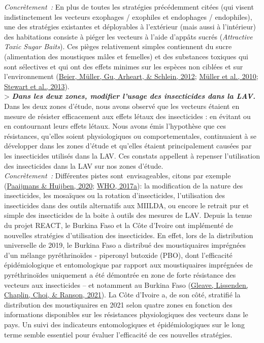 \documentclass[12pt,twoside]{reedthesis}
\begin{document}
\emph{Concrètement~:} En plus de toutes les stratégies précédemment citées (qui visent indistinctement les vecteurs exophages / exophiles et endophages / endophiles), une des stratégies existantes et déployables à l'extérieur (mais aussi à l'intérieur) des habitations consiste à piéger les vecteurs à l'aide d'appâts sucrés (\emph{Attractive Toxic Sugar Baits}). Ces pièges relativement simples contiennent du sucre (alimentation des moustiques mâles et femelles) et des substances toxiques qui sont sélectives et qui ont des effets minimes sur les espèces non ciblées et sur l'environnement (\protect\hyperlink{ref-beier_attractive_2012}{Beier, Müller, Gu, Arheart, \& Schlein, 2012}; \protect\hyperlink{ref-muller_successful_2010}{Müller et al., 2010}; \protect\hyperlink{ref-stewart_indoor_2013}{Stewart et al., 2013}).\\

\textgreater{} \textbf{\emph{Dans les deux zones, modifier l'usage des insecticides dans la LAV.}} Dans les deux zones d'étude, nous avons observé que les vecteurs étaient en mesure de résister efficacement aux effets létaux des insecticides : en évitant ou en contournant leurs effets létaux. Nous avons émis l'hypothèse que ces résistances, qu'elles soient physiologiques ou comportementales, continuaient à se développer dans les zones d'étude et qu'elles étaient principalement causées par les insecticides utilisés dans la LAV. Ces constats appellent à repenser l'utilisation des insecticides dans la LAV sur nos zones d'étude.\\

\emph{Concrètement~:} Différentes pistes sont~envisageables, citons par exemple (\protect\hyperlink{ref-paaijmans_taking_2020}{Paaijmans \& Huijben, 2020}; \protect\hyperlink{ref-organization_framework_2017}{WHO, 2017a}): la modification de la nature des insecticides, les mosaïques ou la rotation d'insecticides, l'utilisation des insecticides dans des outils alternatifs aux MIILDA, ou encore le retrait pur et simple des insecticides de la boite à outils des mesures de LAV. Depuis la tenue du projet REACT, le Burkina Faso et la Côte d'Ivoire ont implémenté de nouvelles stratégies d'utilisation des insecticides. En effet, lors de la distribution universelle de 2019, le Burkina Faso a distribué des moustiquaires imprégnées d'un mélange pyréthrinoïdes - piperonyl butoxide (PBO), dont l'efficacité épidémiologique et entomologique par rapport aux moustiquaires imprégnées de pyréthrinoïdes uniquement a été démontrée en zone de forte résistance des vecteurs aux insecticides -- et notamment au Burkina Faso (\protect\hyperlink{ref-gleave_2021}{Gleave, Lissenden, Chaplin, Choi, \& Ranson, 2021}). La Côte d'Ivoire a, de son côté, stratifié la distribution des moustiquaires en 2021 selon quatre zones en fonction des informations disponibles sur les résistances physiologiques des vecteurs dans le pays. Un suivi des indicateurs entomologiques et épidémiologiques sur le long terme semble essentiel pour évaluer l'efficacité de ces nouvelles stratégies.\\
\end{document}

